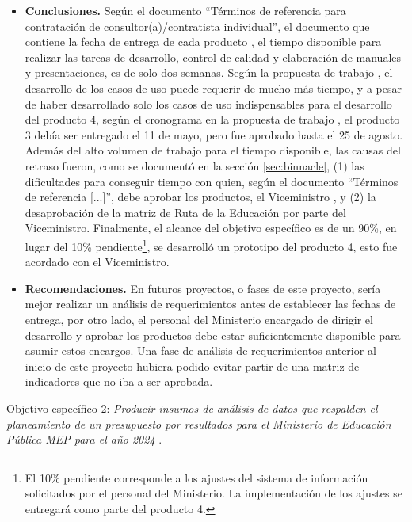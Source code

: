\documentclass[a4paper, 9pt, conference]{article}
\begin{document}
\begin{itemize}
	\item \textbf{Conclusiones.} Seg\'un el documento ``T\'erminos de referencia para contrataci\'on de consultor(a)/contratista individual'', el documento que contiene la fecha de entrega de cada producto \cite{trd}, el tiempo disponible para realizar las tareas de desarrollo, control de calidad y elaboraci\'on de manuales y presentaciones, es de solo dos semanas. Seg\'un la propuesta de trabajo \cite{prop}, el desarrollo de los casos de uso puede requerir de mucho m\'as tiempo, y a pesar de haber desarrollado solo los casos de uso indispensables para el desarrollo del producto 4, seg\'un el cronograma en la propuesta de trabajo \cite{prop}, el producto 3 deb\'ia ser entregado el 11 de mayo, pero fue aprobado hasta el 25 de agosto. Adem\'as del alto volumen de trabajo para el tiempo disponible, las causas del retraso fueron, como se document\'o en la secci\'on \ref{sec:binnacle}, (1) las dificultades para conseguir tiempo con quien, seg\'un el documento ``T\'erminos de referencia [...]'', debe aprobar los productos, el Viceministro \cite{trd}, y (2) la desaprobaci\'on de la matriz de Ruta de la Educaci\'on por parte del Viceministro. Finalmente, el alcance del objetivo espec\'ifico es de un 90\%, en lugar del 10\% pendiente\footnote{El 10\% pendiente corresponde a los ajustes del sistema de informaci\'on solicitados por el personal del Ministerio. La implementaci\'on de los ajustes se entregar\'a como parte del producto 4.}, se desarroll\'o un prototipo del producto 4, esto fue acordado con el Viceministro.
	\item \textbf{Recomendaciones.} En futuros proyectos, o fases de este proyecto, ser\'ia mejor realizar un an\'alisis de requerimientos antes de establecer las fechas de entrega, por otro lado, el personal del Ministerio encargado de dirigir el desarrollo y aprobar los productos debe estar suficientemente disponible para asumir estos encargos. Una fase de an\'alisis de requerimientos anterior al inicio de este proyecto hubiera podido evitar partir de una matriz de indicadores que no iba a ser aprobada.
\end{itemize}

Objetivo espec\'ifico 2: \emph{Producir insumos de an\'alisis de datos que respalden el planeamiento de un presupuesto por resultados para el Ministerio de Educaci\'on P\'ublica MEP para el a\~no 2024} \cite{trd}.



\end{document}

